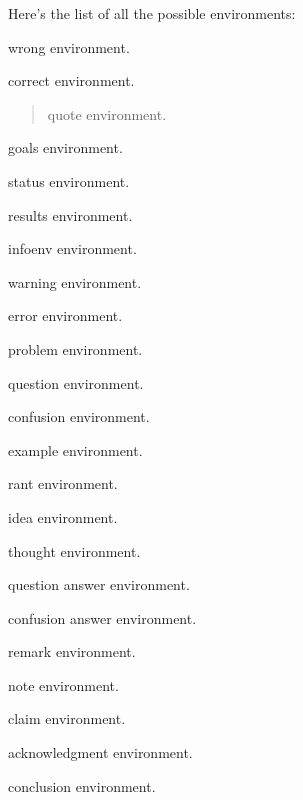 Here's the list of all the possible environments:

\begin{wrong}
  wrong environment.
\end{wrong}
\begin{correct}
  correct environment.
\end{correct}
\begin{quote}
  quote environment.
\end{quote}
\begin{goals}
  goals environment.
\end{goals}
\begin{status}
  status environment.
\end{status}
\begin{results}
  results environment.
\end{results}

\begin{infoenv}
  infoenv environment.
\end{infoenv}
\begin{warning}
  warning environment.
\end{warning}
\begin{error}
  error environment.
\end{error}

\begin{problem}
  problem environment.
\end{problem}
\begin{question}
  question environment.
\end{question}
\begin{confusion}
  confusion environment.
\end{confusion}
\begin{example}
  example environment.
\end{example}

\begin{rant}
  rant environment.
\end{rant}
\begin{idea}
  idea environment.
\end{idea}
\begin{thought}
  thought environment.
\end{thought}
\begin{qstanswer}
  question answer environment.
\end{qstanswer}
\begin{cfsanswer}
  confusion answer environment.
\end{cfsanswer}

\begin{remark}
  remark environment.
\end{remark}
\begin{note}
  note environment.
\end{note}
\begin{claim}
  claim environment.
\end{claim}
\begin{acknowledgment}
  acknowledgment environment.
\end{acknowledgment}
\begin{conclusion}
  conclusion environment.
\end{conclusion}
